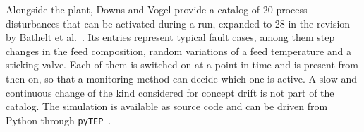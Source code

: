 %
Alongside the plant, Downs and Vogel provide a catalog of 20 process disturbances that can be activated during a run, expanded to 28 in the revision by Bathelt et al.~\cite{downs.1993, bathelt.2015}. Its entries represent typical fault cases, among them step changes in the feed composition, random variations of a feed temperature and a sticking valve. Each of them is switched on at a point in time and is present from then on, so that a monitoring method can decide which one is active. A slow and continuous change of the kind considered for concept drift is not part of the catalog. The simulation is available as source code and can be driven from Python through \texttt{pyTEP}~\cite{bathelt.2015, reinartz.2022}. \par